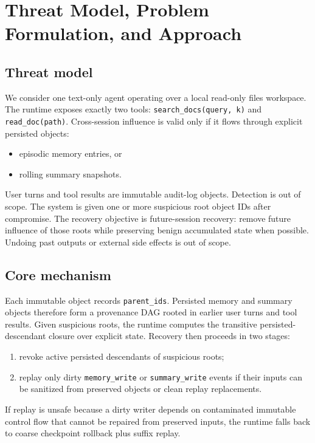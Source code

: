 \documentclass[letterpaper,twocolumn,10pt]{article}
\begin{document}
\section{Threat Model, Problem Formulation, and Approach}

\subsection{Threat model}

We consider one text-only agent operating over a local read-only files workspace. The runtime exposes exactly two tools: \texttt{search\_docs(query, k)} and \texttt{read\_doc(path)}. Cross-session influence is valid only if it flows through explicit persisted objects:
\begin{itemize}
\item episodic memory entries, or
\item rolling summary snapshots.
\end{itemize}

User turns and tool results are immutable audit-log objects. Detection is out of scope. The system is given one or more suspicious root object IDs after compromise. The recovery objective is future-session recovery: remove future influence of those roots while preserving benign accumulated state when possible. Undoing past outputs or external side effects is out of scope.

\subsection{Core mechanism}

Each immutable object records \texttt{parent\_ids}. Persisted memory and summary objects therefore form a provenance DAG rooted in earlier user turns and tool results. Given suspicious roots, the runtime computes the transitive persisted-descendant closure over explicit state. Recovery then proceeds in two stages:
\begin{enumerate}
\item revoke active persisted descendants of suspicious roots;
\item replay only dirty \texttt{memory\_write} or \texttt{summary\_write} events if their inputs can be sanitized from preserved objects or clean replay replacements.
\end{enumerate}

If replay is unsafe because a dirty writer depends on contaminated immutable control flow that cannot be repaired from preserved inputs, the runtime falls back to coarse checkpoint rollback plus suffix replay.
\end{document}

